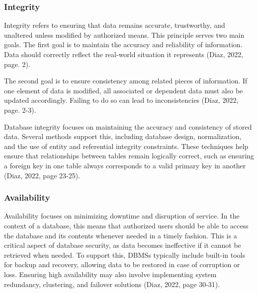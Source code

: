 \subsubsection{Integrity}

Integrity refers to ensuring that data remains accurate, trustworthy, and unaltered unless modified by authorized means. This principle serves two main goals. The first goal is to maintain the accuracy and reliability of information. Data should correctly reflect the real-world situation it represents (Diaz, 2022, page. 2).

The second goal is to ensure consistency among related pieces of information. If one element of data is modified, all associated or dependent data must also be updated accordingly. Failing to do so can lead to inconsistencies (Diaz, 2022, page. 2-3).

Database integrity focuses on maintaining the accuracy and consistency of stored data. Several methods support this, including database design, normalization, and the use of entity and referential integrity constraints. These techniques help ensure that relationships between tables remain logically correct, such as ensuring a foreign key in one table always corresponds to a valid primary key in another (Diaz, 2022, page 23-25).

\subsubsection{Availability}

Availability focuses on minimizing downtime and disruption of service. In the context of a database, this means that authorized users should be able to access the database and its contents whenever needed in a timely fashion. This is a critical aspect of database security, as data becomes ineffective if it cannot be retrieved when needed. To support this, DBMSs typically include built-in tools for backup and recovery, allowing data to be restored in case of corruption or loss. Ensuring high availability may also involve implementing system redundancy, clustering, and failover solutions (Diaz, 2022, page 30-31).